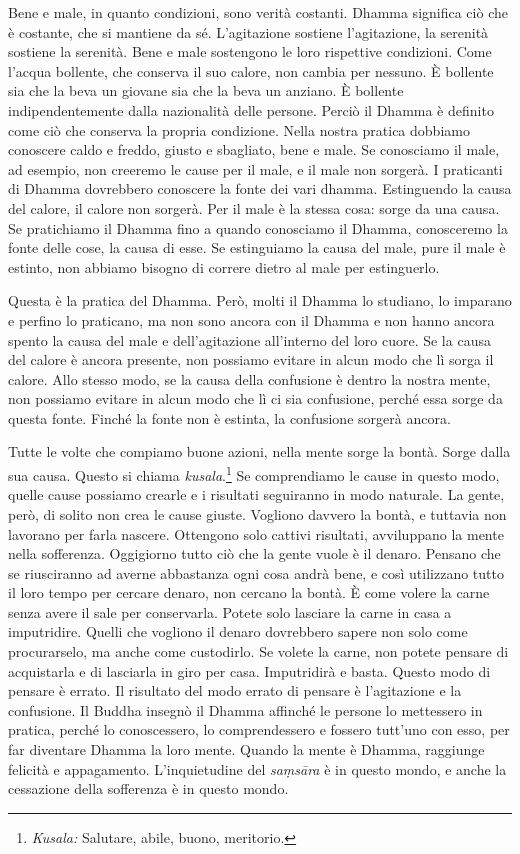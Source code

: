 Bene e male, in quanto condizioni, sono verità costanti. Dhamma
significa ciò che è costante, che si mantiene da sé. L'agitazione
sostiene l'agitazione, la serenità sostiene la serenità. Bene e male
sostengono le loro rispettive condizioni. Come l'acqua bollente, che
conserva il suo calore, non cambia per nessuno. È bollente sia che la
beva un giovane sia che la beva un anziano. È bollente indipendentemente
dalla nazionalità delle persone. Perciò il Dhamma è definito come ciò
che conserva la propria condizione. Nella nostra pratica dobbiamo
conoscere caldo e freddo, giusto e sbagliato, bene e male. Se conosciamo
il male, ad esempio, non creeremo le cause per il male, e il male non
sorgerà. I praticanti di Dhamma dovrebbero conoscere la fonte dei vari
dhamma. Estinguendo la causa del calore, il calore non sorgerà.
Per il male è la stessa cosa: sorge da una causa. Se pratichiamo il
Dhamma fino a quando conosciamo il Dhamma, conosceremo la fonte delle
cose, la causa di esse. Se estinguiamo la causa del male, pure il male è
estinto, non abbiamo bisogno di correre dietro al male per estinguerlo.

Questa è la pratica del Dhamma. Però, molti il Dhamma lo studiano, lo
imparano e perfino lo praticano, ma non sono ancora con il Dhamma e non
hanno ancora spento la causa del male e dell'agitazione all'interno del
loro cuore. Se la causa del calore è ancora presente, non possiamo
evitare in alcun modo che lì sorga il calore. Allo stesso modo, se la
causa della confusione è dentro la nostra mente, non possiamo evitare in
alcun modo che lì ci sia confusione, perché essa sorge da questa fonte.
Finché la fonte non è estinta, la confusione sorgerà ancora.

Tutte le volte che compiamo buone azioni, nella mente sorge la bontà.
Sorge dalla sua causa. Questo si chiama \emph{kusala}.\footnote{\emph{Kusala:}
  Salutare, abile, buono, meritorio.} Se comprendiamo le cause in questo
modo, quelle cause possiamo crearle e i risultati seguiranno in modo
naturale. La gente, però, di solito non crea le cause giuste. Vogliono
davvero la bontà, e tuttavia non lavorano per farla nascere. Ottengono
solo cattivi risultati, avviluppano la mente nella sofferenza.
Oggigiorno tutto ciò che la gente vuole è il denaro. Pensano che se
riusciranno ad averne abbastanza ogni cosa andrà bene, e così utilizzano
tutto il loro tempo per cercare denaro, non cercano la bontà. È come
volere la carne senza avere il sale per conservarla. Potete solo
lasciare la carne in casa a imputridire. Quelli che vogliono il denaro
dovrebbero sapere non solo come procurarselo, ma anche come custodirlo.
Se volete la carne, non potete pensare di acquistarla e di lasciarla in
giro per casa. Imputridirà e basta. Questo modo di pensare è errato. Il
risultato del modo errato di pensare è l'agitazione e la confusione. Il
Buddha insegnò il Dhamma affinché le persone lo mettessero in pratica,
perché lo conoscessero, lo comprendessero e fossero tutt'uno con esso,
per far diventare Dhamma la loro mente. Quando la mente è Dhamma,
raggiunge felicità e appagamento. L'inquietudine del \emph{saṃsāra} è in
questo mondo, e anche la cessazione della sofferenza è in questo mondo.

